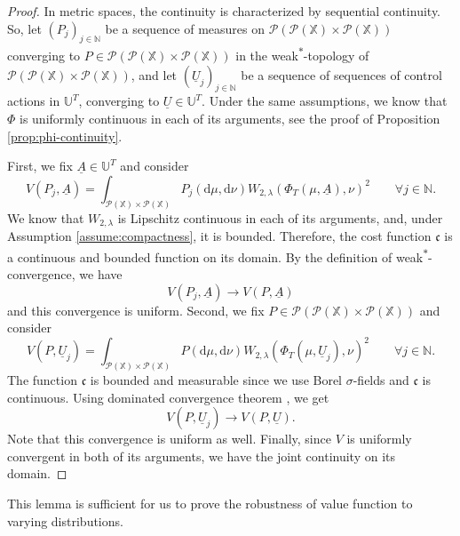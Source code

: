 \documentclass[11pt]{article}
\newcommand{\NN}{\mathbb{N}}
\newcommand{\XX}{\mathbb{X}}
\newcommand{\UU}{\mathbb{U}}
\newcommand{\cP}{\mathcal{P}}
\newcommand{\fc}{\mathfrak{c}}
\newcommand{\de}{\mathrm{d}} %
\begin{document}
\begin{proof}
    In metric spaces, the continuity is characterized by sequential continuity. So, let $(P_j)_{j\in\NN}$ be a sequence of measures on $\cP(\cP(\XX)\times\cP(\XX))$ converging to $P\in\cP(\cP(\XX)\times\cP(\XX))$ in the weak\textsuperscript{$*$}-topology of $\cP(\cP(\XX)\times\cP(\XX))$, and let $(\underline{U}_j)_{j\in\NN}$ be a sequence of sequences of control actions in $\UU^T$, converging to $\underline{U}\in\UU^T$. Under the same assumptions, we know that $\Phi$ is uniformly continuous in each of its arguments, see the proof of Proposition \ref{prop:phi-continuity}. 

    First, we fix $\underline{A}\in\UU^T$ and consider
    \begin{equation*}
        V(P_j, \underline{A}) = \int_{\cP(\XX)\times\cP(\XX)}P_j(\de\mu,\de\nu)W_{2,\lambda}(\Phi_T(\mu, \underline{A}), \nu)^2 \qquad \forall j\in\NN.
    \end{equation*}
    We know that $W_{2,\lambda}$ is Lipschitz continuous in each of its arguments, and, under Assumption \ref{assume:compactness}, it is bounded. Therefore, the cost function $\fc$ is a continuous and bounded function on its domain. By the definition of weak\textsuperscript{$*$}-convergence, we have
    \begin{equation*}
        V(P_j, \underline{A}) \to V(P, \underline{A})
    \end{equation*}
    and this convergence is uniform. Second, we fix $P\in\cP(\cP(\XX)\times\cP(\XX))$ and consider
    \begin{equation*}
        V(P, \underline{U}_j) = \int_{\cP(\XX)\times\cP(\XX)}P(\de\mu,\de\nu)W_{2,\lambda}(\Phi_T(\mu, \underline{U}_j), \nu)^2 \qquad \forall j\in\NN.
    \end{equation*}
    The function $\fc$ is bounded and measurable since we use Borel $\sigma$-fields and $\fc$ is continuous. Using dominated convergence theorem \cite[Theorem 2.4.5]{cohn2013measure},
    we get
    \begin{equation*}
        V(P, \underline{U}_j) \to V(P, \underline{U}).
    \end{equation*}
    Note that this convergence is uniform as well. Finally, since $V$ is uniformly convergent in both of its arguments, we have the joint continuity on its domain.
\end{proof}

This lemma is sufficient for us to prove the robustness of value function to varying distributions.
\end{document}
